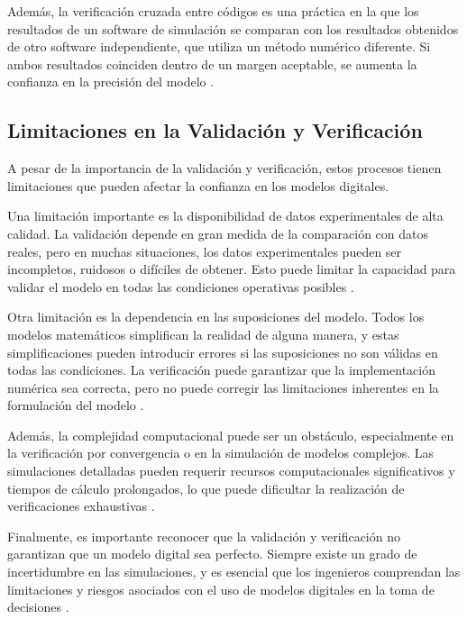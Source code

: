 Además, la verificación cruzada entre códigos es una práctica en la que los resultados de un software de simulación se comparan con los resultados obtenidos de otro software independiente, que utiliza un método numérico diferente. Si ambos resultados coinciden dentro de un margen aceptable, se aumenta la confianza en la precisión del modelo \cite{ferziger2012computational}.

\subsection{Limitaciones en la Validación y Verificación}

A pesar de la importancia de la validación y verificación, estos procesos tienen limitaciones que pueden afectar la confianza en los modelos digitales.

Una limitación importante es la disponibilidad de datos experimentales de alta calidad. La validación depende en gran medida de la comparación con datos reales, pero en muchas situaciones, los datos experimentales pueden ser incompletos, ruidosos o difíciles de obtener. Esto puede limitar la capacidad para validar el modelo en todas las condiciones operativas posibles \cite{oberkampf2010verification}.

Otra limitación es la dependencia en las suposiciones del modelo. Todos los modelos matemáticos simplifican la realidad de alguna manera, y estas simplificaciones pueden introducir errores si las suposiciones no son válidas en todas las condiciones. La verificación puede garantizar que la implementación numérica sea correcta, pero no puede corregir las limitaciones inherentes en la formulación del modelo \cite{karniadakis2021physics}.

Además, la complejidad computacional puede ser un obstáculo, especialmente en la verificación por convergencia o en la simulación de modelos complejos. Las simulaciones detalladas pueden requerir recursos computacionales significativos y tiempos de cálculo prolongados, lo que puede dificultar la realización de verificaciones exhaustivas \cite{roache1998verification}.

Finalmente, es importante reconocer que la validación y verificación no garantizan que un modelo digital sea perfecto. Siempre existe un grado de incertidumbre en las simulaciones, y es esencial que los ingenieros comprendan las limitaciones y riesgos asociados con el uso de modelos digitales en la toma de decisiones \cite{oberkampf2010verification}.

